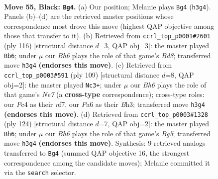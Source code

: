 \documentclass[11pt]{article}
\begin{document}
\clearpage

\begin{figure}[p]\centering
\begin{subfigure}{0.46\textwidth}\centering
\resizebox{\linewidth}{!}{%
\newchessgame
\chessboard[
  setfen={8/8/pB6/4k3/2p5/7b/5K2/1N6 b - - 9 55},
  showmover=false,
  pgfstyle=straightmove, color=movearrow, markmove={h3-g4}
]}
\caption{}
\end{subfigure}\hfill
\begin{subfigure}{0.46\textwidth}\centering
\resizebox{\linewidth}{!}{%
\newchessgame
\chessboard[
  setfen={3B4/8/6k1/4K3/8/5P2/2b4P/8 w - - 13 59},
  showmover=false,
  pgfstyle=straightmove, color=movearrow, markmove={d8-b6}
]}
\caption{}
\end{subfigure}
\\[4pt]
\begin{subfigure}{0.46\textwidth}\centering
\resizebox{\linewidth}{!}{%
\newchessgame
\chessboard[
  setfen={8/5N1B/8/7k/4K3/7b/4n3/8 b - - 3 55},
  showmover=false,
  pgfstyle=straightmove, color=movearrow, markmove={e2-c3}
]}
\caption{}
\end{subfigure}\hfill
\begin{subfigure}{0.46\textwidth}\centering
\resizebox{\linewidth}{!}{%
\newchessgame
\chessboard[
  setfen={4k3/8/6P1/6B1/b7/7P/7K/8 w - - 7 63},
  showmover=false,
  pgfstyle=straightmove, color=movearrow, markmove={g5-h6}
]}
\caption{}
\end{subfigure}
\caption{\textbf{Move 55, Black: \texttt{Bg4}.} (a) Our position; Melanie plays \texttt{Bg4} (\texttt{h3g4}). Panels (b)--(d) are the retrieved master positions whose correspondence most drove this move (highest QAP objective among those that transfer to it). (b) Retrieved from \texttt{ccrl\_top\_p0001\#2601} (ply 116) [structural distance $d$=3, QAP obj=3]: the master played \texttt{Bb6}; under $\mu$ our \emph{Bh6} plays the role of that game's \emph{Bd8}; transferred move \texttt{h3g4} \textbf{(endorses this move)}. (c) Retrieved from \texttt{ccrl\_top\_p0003\#591} (ply 109) [structural distance $d$=8, QAP obj=2]: the master played \texttt{Nc3+}; under $\mu$ our \emph{Bh6} plays the role of that game's \emph{Ne7} (a \textbf{cross-type} correspondence); cross-type roles: our \emph{P}c4 as their \emph{n}f7, our \emph{P}a6 as their \emph{B}h3; transferred move \texttt{h3g4} \textbf{(endorses this move)}. (d) Retrieved from \texttt{ccrl\_top\_p0003\#1328} (ply 124) [structural distance $d$=7, QAP obj=2]: the master played \texttt{Bh6}; under $\mu$ our \emph{Bh6} plays the role of that game's \emph{Bg5}; transferred move \texttt{h3g4} \textbf{(endorses this move)}. Synthesis: 9 retrieved analogs transferred to \texttt{Bg4} (summed QAP objective 16, the strongest correspondence among the candidate moves); Melanie committed it via the \texttt{search} selector.}
\label{fig:thought-m109}
\end{figure}
\end{document}

